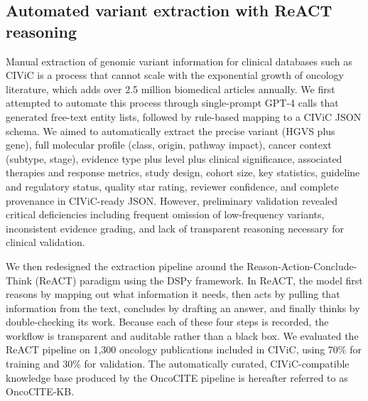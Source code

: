 % 
%
%

\subsection{Automated variant extraction with ReACT reasoning}\label{subsec2}

Manual extraction of genomic variant information for clinical databases such as CIViC is a process that cannot scale with the exponential growth of oncology literature, which adds over 2.5 million biomedical articles annually\cite{bib16,bib17}. We first attempted to automate this process through single-prompt GPT-4 calls that generated free-text entity lists, followed by rule-based mapping to a CIViC JSON schema\cite{bib18}. We aimed to automatically extract the precise variant (HGVS plus gene), full molecular profile (class, origin, pathway impact), cancer context (subtype, stage), evidence type plus level plus clinical significance, associated therapies and response metrics, study design, cohort size, key statistics, guideline and regulatory status, quality star rating, reviewer confidence, and complete provenance in CIViC-ready JSON. However, preliminary validation revealed critical deficiencies including frequent omission of low-frequency variants, inconsistent evidence grading, and lack of transparent reasoning necessary for clinical validation.

We then redesigned the extraction pipeline around the Reason-Action-Conclude-Think (ReACT) paradigm using the DSPy framework\cite{bib19}. In ReACT, the model first reasons by mapping out what information it needs, then acts by pulling that information from the text, concludes by drafting an answer, and finally thinks by double-checking its work. Because each of these four steps is recorded, the workflow is transparent and auditable rather than a black box. We evaluated the ReACT pipeline on 1,300 oncology publications included in CIViC, using 70\% for training and 30\% for validation. The automatically curated, CIViC-compatible knowledge base produced by the OncoCITE pipeline is hereafter referred to as OncoCITE-KB.

